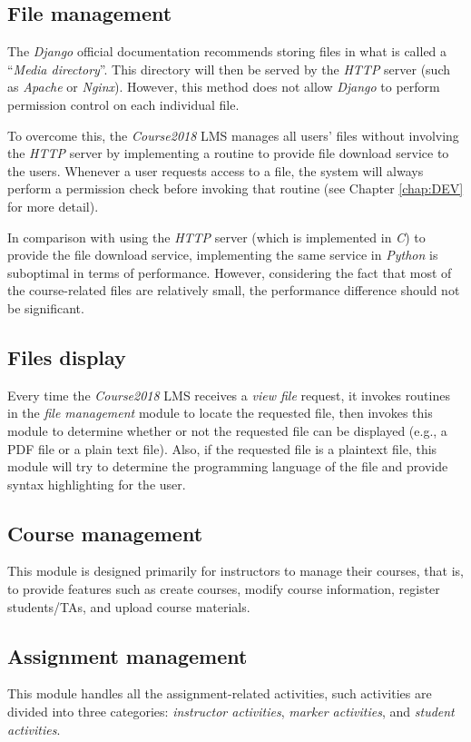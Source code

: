 \subsection{File management}
The \emph{Django} official documentation recommends storing files in what is
called a ``\emph{Media directory}''. This directory will then be served by the
\emph{HTTP} server \cite{djangoManagingFiles}
(such as \emph{Apache} or \emph{Nginx}). However, this method does not allow
\emph{Django} to perform permission control on each individual file.

\medskip

To overcome this, the \emph{Course2018} LMS manages all users' files without
involving the \emph{HTTP} server by implementing a routine to provide file
download service to the users. Whenever a user requests access to a file, the system
will always perform a permission check before invoking that routine
(see Chapter \ref{chap:DEV} for more detail).

\medskip

In comparison with
using the \emph{HTTP} server (which is implemented in \emph{C}) to provide
the file download service,
implementing the same service in \emph{Python} is suboptimal in terms of
performance.
However, considering the fact that most of the course-related
files are relatively small, the performance difference should
not be significant.

\subsection{Files display}
Every time the \emph{Course2018} LMS receives a \emph{view file} request,
it invokes routines in the \emph{file management} module to locate the
requested file, then invokes this module to determine whether or not the
requested file can be displayed (e.g., a PDF file or a plain text file). Also,
if the requested file is a plaintext file, this module will try to determine
the programming language of the file and provide syntax highlighting for the
user.

\subsection{Course management}
This module is designed primarily for instructors to manage their courses, 
that is, to provide features such as create courses, modify course information,
register students/TAs, and upload course materials.

\subsection{Assignment management}
\label{sec:ASNMAN}
This module handles all the assignment-related activities, such activities are
divided into three categories: \emph{instructor activities}, 
\emph{marker activities}, and \emph{student activities}.

